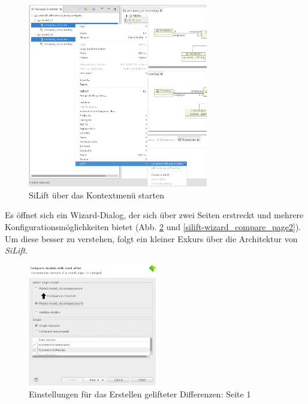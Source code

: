 \begin{figure}[h!]
\centering
\includegraphics[width=0.7\textwidth]{lifting/graphics/silift-contextmenu_compare.png}
\caption{SiLift über das Kontextmenü starten}
\label{silift-contextmenu_compare}
\end{figure}

Es öffnet sich ein Wizard-Dialog, der sich über zwei Seiten erstreckt und mehrere Konfigurationsmöglichkeiten bietet (Abb. \ref{silift-wizard_compare_page1} und \ref{silift-wizard_compare_page2}).
Um diese besser zu verstehen, folgt ein kleiner Exkurs über die Architektur von \textit{SiLift}.

\begin{figure}[h!]
\centering
\includegraphics[width=0.5\textwidth]{lifting/graphics/silift-wizard_compare_page1.png}
\caption{Einstellungen für das Erstellen gelifteter Differenzen: Seite 1}
\label{silift-wizard_compare_page1}
\end{figure}

